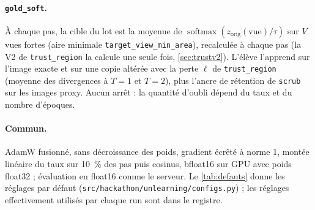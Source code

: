 \documentclass[11pt,a4paper]{article}
\newcommand{\orig}{\mathrm{orig}}
\newcommand{\code}[1]{\texttt{#1}}
\newcommand{\chemin}[1]{\nolinkurl{#1}}%
\begin{document}
\paragraph{\code{gold\_soft}.} À chaque pas, la cible du lot est la moyenne de
$\operatorname{softmax}(z_\orig(\text{vue})/\tau)$ sur $V$ vues fortes (aire minimale
\code{target\_view\_min\_area}), recalculée à chaque pas (la V2 de \code{trust\_region} la calcule une seule fois,
\cref{sec:trustv2}). L'élève l'apprend sur l'image exacte et sur une copie altérée avec la perte
$\ell$ de \code{trust\_region} (moyenne des divergences à $T=1$ et $T=2$), plus l'ancre de rétention
de \code{scrub} sur les images proxy. Aucun arrêt : la quantité d'oubli dépend du taux et du nombre
d'époques.

\paragraph{Commun.} AdamW fusionné, sans décroissance des poids, gradient écrêté à norme 1, montée
linéaire du taux sur \SI{10}{\percent} des pas puis cosinus, bfloat16 sur GPU avec poids float32 ;
évaluation en float16 comme le serveur. Le \cref{tab:defauts} donne les réglages par défaut
(\chemin{src/hackathon/unlearning/configs.py}) ; les réglages effectivement utilisés par chaque run
sont dans le registre.
\end{document}
